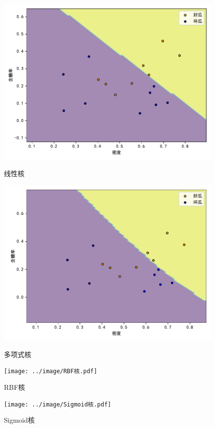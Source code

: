 \documentclass{ctexart}
\begin{document}
	\begin{figure}[!htb]
		\centering
		\begin{minipage}{0.49\linewidth}
			\centering
			\includegraphics[width=\textwidth]{../image/线性核.pdf}
			\caption{线性核}
			\label{linear}%
		\end{minipage}
		\begin{minipage}{0.49\linewidth}
			\centering
			\includegraphics[width=\textwidth]{../image/多项式核.pdf}
			\caption{多项式核}
			\label{poly}%
		\end{minipage}
	
		\begin{minipage}{0.49\linewidth}
			\centering
			\texttt{[image: ../image/RBF核.pdf]}
			\caption{RBF核}
			\label{rbf}
		\end{minipage}
		\begin{minipage}{0.49\linewidth}
			\centering
			\texttt{[image: ../image/Sigmoid核.pdf]}
			\caption{Sigmoid核}
			\label{sigmoid}
		\end{minipage}
		

\end{figure}
\end{document}
